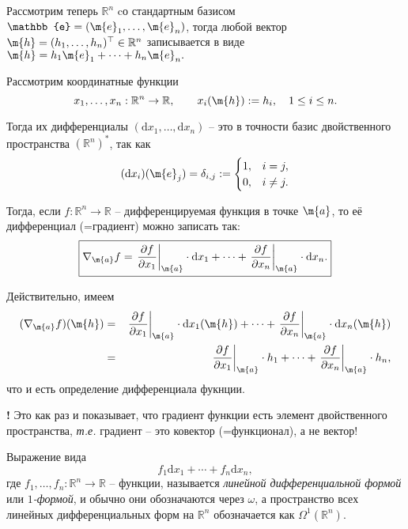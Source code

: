 \begin{remark}
Рассмотрим теперь $\mathbb{R}^n$ cо стандартным базисом $\mathbb{e} = (\m{e}_1,\ldots, \m{e}_n)$, тогда любой вектор $\m{h} = (h_1,\ldots, h_n)^\top  \in \mathbb{R}^n$ записывается в виде $\m{h} = h_1\m{e}_1 + \cdots + h_n \m{e}_n.$ 

Рассмотрим координатные функции 
\[
 x_1,\ldots, x_n:\mathbb{R}^n \to \mathbb{R}, \qquad x_i(\m{h}): = h_i, \quad 1 \le i \le n.
\]

Тогда их дифференциалы $(\mathrm{d}x_1, \ldots, \mathrm{d}x_n)$ -- это в точности базис двойственного пространства $(\mathbb{R}^n)^*$, так как
\[
 (\mathrm{d}x_i)(\m{e}_j) = \delta_{i,j}: = \begin{cases}
     1, & i = j, \\
     0, & i \ne j.
 \end{cases}
\]

Тогда, если $f:\mathbb{R}^n \to \mathbb{R}$ -- дифференцируемая функция в точке $\m{a}$, то её дифференциал (=градиент) можно записать так:
\begin{equation}\label{differential_via_dx}
  \boxed{
 \nabla_\m{a} f = \left.\frac{\partial f}{\partial x_1}\right|_\m{a} \cdot \mathrm{d}x_1 + \cdots +  \left.\frac{\partial f}{\partial x_n}\right|_\m{a} \cdot \mathrm{d}x_n.
    }    
\end{equation}

Действительно, имеем
\begin{eqnarray*}
    (\nabla_\m{a} f) (\m{h}) &=& \left.\frac{\partial f}{\partial x_1}\right|_\m{a} \cdot \mathrm{d}x_1(\m{h}) + \cdots +  \left.\frac{\partial f}{\partial x_n}\right|_\m{a} \cdot \mathrm{d}x_n (\m{h}) \\
    &=& \left.\frac{\partial f}{\partial x_1}\right|_\m{a} \cdot h_1 + \cdots +  \left.\frac{\partial f}{\partial x_n}\right|_\m{a} \cdot h_n ,
   \end{eqnarray*}
   что и есть определение дифференциала фукнции.
\end{remark}

\begin{mydanger}{\bf{!}}
    Это как раз и показывает, что градиент функции есть элемент двойственного пространства, \textit{т.е.} градиент -- это ковектор (=функционал), а не вектор!
\end{mydanger}

\begin{definition}
    Выражение вида 
    \[
     f_1 \mathrm{d}x_1 + \cdots + f_n \mathrm{d}x_n,
    \]
    где $f_1,\ldots, f_n:\mathbb{R}^n \to \mathbb{R}$ -- функции, называется \textit{линейной дифференциальной формой} или \textit{$1$-формой}, и обычно они обозначаются через $\omega$, а пространство всех линейных дифференциальных форм на $\mathbb{R}^n$ обозначается как $\Omega^1(\mathbb{R}^n).$
\end{definition}

